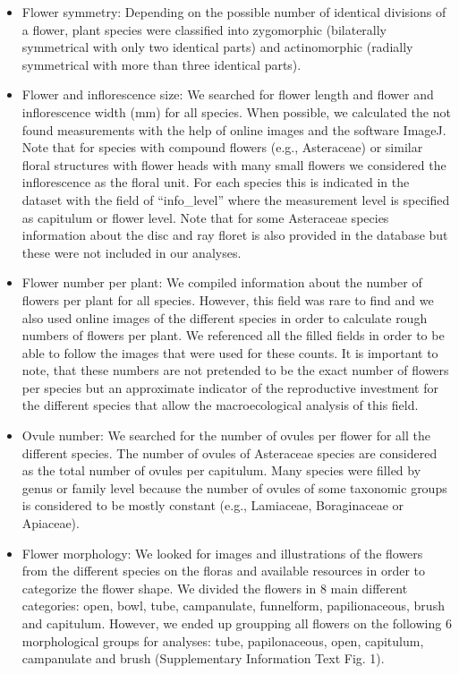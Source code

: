 \documentclass[
  12pt,
]{article}
\begin{document}
\begin{itemize}
\item
  Flower symmetry: Depending on the possible number of identical
  divisions of a flower, plant species were classified into zygomorphic
  (bilaterally symmetrical with only two identical parts) and
  actinomorphic (radially symmetrical with more than three identical
  parts).
\item
  Flower and inflorescence size: We searched for flower length and
  flower and inflorescence width (mm) for all species. When possible, we
  calculated the not found measurements with the help of online images
  and the software ImageJ. Note that for species with compound flowers
  (e.g., Asteraceae) or similar floral structures with flower heads with
  many small flowers we considered the inflorescence as the floral unit.
  For each species this is indicated in the dataset with the field of
  ``info\_level'' where the measurement level is specified as capitulum
  or flower level. Note that for some Asteraceae species information
  about the disc and ray floret is also provided in the database but
  these were not included in our analyses.
\item
  Flower number per plant: We compiled information about the number of
  flowers per plant for all species. However, this field was rare to
  find and we also used online images of the different species in order
  to calculate rough numbers of flowers per plant. We referenced all the
  filled fields in order to be able to follow the images that were used
  for these counts. It is important to note, that these numbers are not
  pretended to be the exact number of flowers per species but an
  approximate indicator of the reproductive investment for the different
  species that allow the macroecological analysis of this field.
\item
  Ovule number: We searched for the number of ovules per flower for all
  the different species. The number of ovules of Asteraceae species are
  considered as the total number of ovules per capitulum. Many species
  were filled by genus or family level because the number of ovules of
  some taxonomic groups is considered to be mostly constant (e.g.,
  Lamiaceae, Boraginaceae or Apiaceae).
\item
  Flower morphology: We looked for images and illustrations of the
  flowers from the different species on the floras and available
  resources in order to categorize the flower shape. We divided the
  flowers in 8 main different categories: open, bowl, tube, campanulate,
  funnelform, papilionaceous, brush and capitulum. However, we ended up
  groupping all flowers on the following 6 morphological groups for
  analyses: tube, papilonaceous, open, capitulum, campanulate and brush
  (Supplementary Information Text Fig. 1).
\end{itemize}
\end{document}
